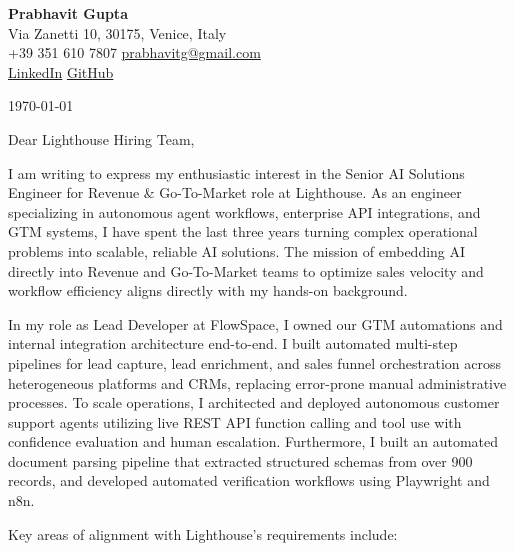 \documentclass[11pt,a4paper]{article}
\begin{document}
\begin{center}
    {\huge \textbf{Prabhavit Gupta}} \\
    \vspace{4pt}
    Via Zanetti 10, 30175, Venice, Italy \\
    +39 351 610 7807 \textbar{} \href{mailto:prabhavitg@gmail.com}{prabhavitg@gmail.com} \\
    \href{https://www.linkedin.com/in/prabhavit/}{LinkedIn} \textbar{} \href{https://github.com/prab-gupta}{GitHub}
\end{center}

\vspace{14pt}

\noindent \today

\vspace{6pt}

\noindent Dear Lighthouse Hiring Team,

\vspace{6pt}

\noindent I am writing to express my enthusiastic interest in the Senior AI Solutions Engineer for Revenue \& Go-To-Market role at Lighthouse. As an engineer specializing in autonomous agent workflows, enterprise API integrations, and GTM systems, I have spent the last three years turning complex operational problems into scalable, reliable AI solutions. The mission of embedding AI directly into Revenue and Go-To-Market teams to optimize sales velocity and workflow efficiency aligns directly with my hands-on background.

\noindent In my role as Lead Developer at FlowSpace, I owned our GTM automations and internal integration architecture end-to-end. I built automated multi-step pipelines for lead capture, lead enrichment, and sales funnel orchestration across heterogeneous platforms and CRMs, replacing error-prone manual administrative processes. To scale operations, I architected and deployed autonomous customer support agents utilizing live REST API function calling and tool use with confidence evaluation and human escalation. Furthermore, I built an automated document parsing pipeline that extracted structured schemas from over 900 records, and developed automated verification workflows using Playwright and n8n.

\noindent Key areas of alignment with Lighthouse's requirements include:
\end{document}
